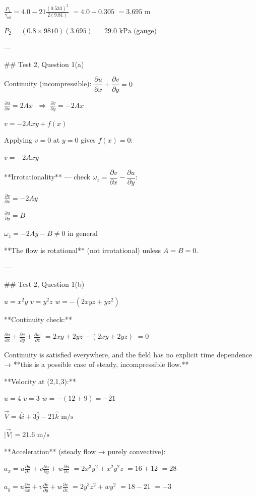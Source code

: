 $\frac{P_2}{\gamma_{oil}} = 4.0 - 21\frac{(0.533)^2}{2(9.81)}$
$= 4.0-0.305$
$= 3.695\text{ m}$

$P_2 = (0.8\times9810)(3.695)$
$= \boxed{29.0\text{ kPa (gauge)}}$

---

## Test 2, Question 1(a)

Continuity (incompressible):
$\dfrac{\partial u}{\partial x}+\dfrac{\partial v}{\partial y}=0$

$\frac{\partial u}{\partial x} = 2Ax$
$\;\Rightarrow\; \frac{\partial v}{\partial y} = -2Ax$

$v = -2Axy + f(x)$

Applying $v=0$ at $y=0$ gives $f(x)=0$:

$\boxed{v = -2Axy}$

**Irrotationality** — check $\omega_z = \dfrac{\partial v}{\partial x}-\dfrac{\partial u}{\partial y}$:

$\frac{\partial v}{\partial x} = -2Ay$

$\frac{\partial u}{\partial y} = B$

$\omega_z = -2Ay - B \neq 0 \text{ in general}$

**The flow is rotational** (not irrotational) unless $A=B=0$.

---

## Test 2, Question 1(b)

$u=x^2y$
$v=y^2z$
$w=-(2xyz+yz^2)$

**Continuity check:**

$\frac{\partial u}{\partial x}+\frac{\partial v}{\partial y}+\frac{\partial w}{\partial z}$
$= 2xy + 2yz -(2xy+2yz)$
$= 0$

Continuity is satisfied everywhere, and the field has no explicit time dependence → **this is a possible case of steady, incompressible flow.**

**Velocity at (2,1,3):**

$u=4$
$v=3$
$w=-(12+9)=-21$

$\vec V = 4\hat i+3\hat j-21\hat k \text{ m/s}$

$\vert{}\vec V\vert{} = \boxed{21.6\text{ m/s}}$

**Acceleration** (steady flow → purely convective):

$a_x = u\frac{\partial u}{\partial x}+v\frac{\partial u}{\partial y}+w\frac{\partial u}{\partial z}$
$= 2x^3y^2+x^2y^2z$
$= 16+12$
$= 28$

$a_y = u\frac{\partial v}{\partial x}+v\frac{\partial v}{\partial y}+w\frac{\partial v}{\partial z}$
$= 2y^3z^2+wy^2$
$= 18-21$
$= -3$

